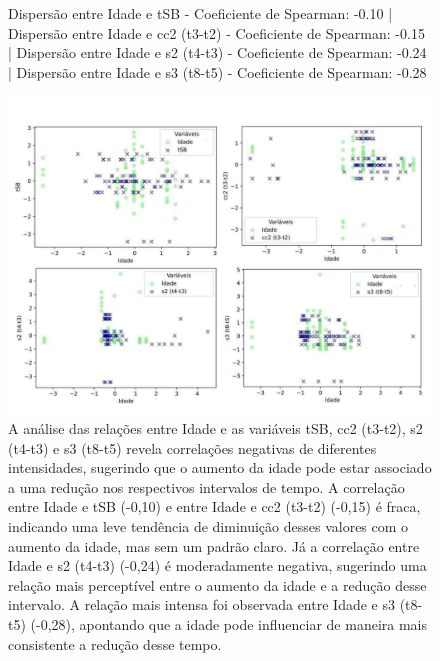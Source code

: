 \begin{figure}[h]
    \captionsetup{font=footnotesize, justification=centering, labelsep=period, position=above}
    \caption{Dispersão entre Idade e tSB - Coeficiente de Spearman: -0.10 | Dispersão entre Idade e cc2 (t3-t2) - Coeficiente de Spearman: -0.15 | Dispersão entre Idade e s2 (t4-t3) - Coeficiente de Spearman: -0.24 | Dispersão entre Idade e s3 (t8-t5) - Coeficiente de Spearman: -0.28}
    \label{fig:idade-tSB-cc2-s2-s3}
    \centering
    \includegraphics[scale=0.4]{figuras/Spearman/Idade-tSB_cc2_s2_s3.pdf}
    \vspace{0.3cm} 
    \caption{A análise das relações entre Idade e as variáveis tSB, cc2 (t3-t2), s2 (t4-t3) e s3 (t8-t5) revela correlações negativas de diferentes intensidades, sugerindo que o aumento da idade pode estar associado a uma redução nos respectivos intervalos de tempo. A correlação entre Idade e tSB (-0,10) e entre Idade e cc2 (t3-t2) (-0,15) é fraca, indicando uma leve tendência de diminuição desses valores com o aumento da idade, mas sem um padrão claro. Já a correlação entre Idade e s2 (t4-t3) (-0,24) é moderadamente negativa, sugerindo uma relação mais perceptível entre o aumento da idade e a redução desse intervalo. A relação mais intensa foi observada entre Idade e s3 (t8-t5) (-0,28), apontando que a idade pode influenciar de maneira mais consistente a redução desse tempo. }
    \begin{minipage}{\linewidth}
        \centering
    \end{minipage}
\end{figure}
\FloatBarrier

